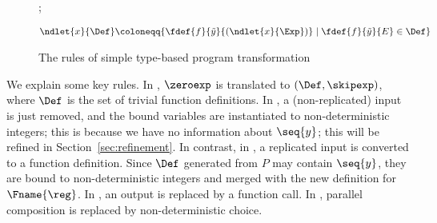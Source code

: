 \begin{figure}[tb]
          \vspace*{1ex}

{\env; \chenv \vdash {} \Rightarrow
  }

    \begin{align*}
        \ndlet{x}{\Def} \coloneqq
& \{ \fdef{f}{\tilde{y}}{(\ndlet{x}{\Exp})} \mid \fdef{f}{\tilde{y}}{E} \in \Def \} 
    \end{align*}
    \normalsize
    \caption{The rules of simple type-based program transformation}
    \label{fig:program_transformation}
\end{figure}

We explain some key rules.
In , \(\zeroexp\) is translated to \((\Def,\skipexp)\),
where \(\Def\) is the set of trivial function definitions.
In , a (non-replicated) input is just removed, 
and the bound variables are instantiated to non-deterministic integers;
this is because we have no information about \(\seq{y}\); this will be refined
in Section~\ref{sec:refinement}. In contrast,
in , a replicated input is converted to a function definition.
Since \(\Def\) generated from \(P\) may contain \(\seq{y}\), they are
 bound to non-deterministic integers and merged with the new definition for \(\Fname{\reg}\).
In , an output is replaced by a function call.
In , parallel composition is replaced by non-deterministic choice.



